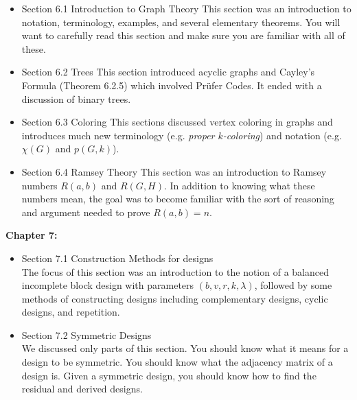 \documentclass[11pt]{article}
\begin{document}
\begin{itemize}
\item Section 6.1 Introduction to Graph Theory
This section was an introduction to notation, terminology, examples, and several elementary theorems. You will want to carefully read this section and make sure you are familiar with all of these.\\
\item Section 6.2 Trees
This section introduced acyclic graphs and Cayley's Formula (Theorem 6.2.5) which involved Pr\"{u}fer Codes. It ended with a discussion of binary trees.\\
\item Section 6.3 Coloring
This sections discussed vertex coloring in graphs and introduces much new terminology (e.g. \emph{proper $k$-coloring}) and notation (e.g. $\chi(G)$ and $p(G,k)$).\\
\item Section 6.4 Ramsey Theory
This section was an introduction to Ramsey numbers $R(a,b)$ and $R(G,H)$.  In addition to knowing what these numbers mean, the goal was to become familiar with the sort of reasoning and argument needed to prove $R(a,b)=n.$\\
\end{itemize}

\noindent\textbf{Chapter 7:}
\begin{itemize}
\item Section 7.1 Construction Methods for designs\\
The focus of this section was an introduction to the notion of a balanced incomplete block design with parameters $(b,v,r,k,\lambda)$, followed by some methods of constructing designs including complementary designs, cyclic designs, and repetition.
\item Section 7.2 Symmetric Designs\\
We discussed only parts of this section. You should know what it means for a design to be symmetric. You should know what the adjacency matrix of a design is. Given a symmetric design, you should know how to find the residual and derived designs.\\
\end{itemize}
\end{document}
